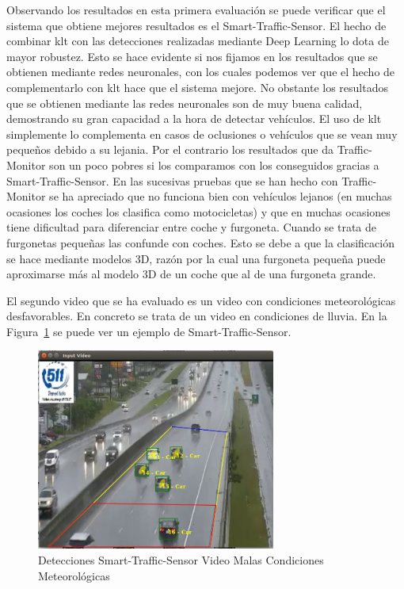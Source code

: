 Observando los resultados en esta primera evaluación se puede verificar que el sistema que obtiene mejores resultados es el Smart-Traffic-Sensor. El hecho de combinar \acrshort{klt} con las detecciones realizadas mediante Deep Learning lo dota de mayor robustez. Esto se hace evidente si nos fijamos en los resultados que se obtienen mediante redes neuronales, con los cuales podemos ver que el hecho de complementarlo con \acrshort{klt} hace que el sistema mejore. No obstante los resultados que se obtienen mediante las redes neuronales son de muy buena calidad, demostrando su gran capacidad a la hora de detectar vehículos. El uso de \acrshort{klt} simplemente lo complementa en casos de oclusiones o vehículos que se vean muy pequeños debido a su lejania. Por el contrario los resultados que da Traffic-Monitor son un poco pobres si los comparamos con los conseguidos gracias a Smart-Traffic-Sensor. En las sucesivas pruebas que se han hecho con Traffic-Monitor se ha apreciado que no funciona bien con vehículos lejanos (en muchas ocasiones los coches los clasifica como motocicletas) y que en muchas ocasiones tiene dificultad para diferenciar entre coche y furgoneta. Cuando se trata de furgonetas pequeñas las confunde con coches. Esto se debe a que la clasificación se hace mediante modelos 3D, razón por la cual una furgoneta pequeña puede aproximarse más al modelo 3D de un coche que al de una furgoneta grande.


El segundo video que se ha evaluado es un video con condiciones meteorológicas desfavorables. En concreto se trata de un video en condiciones de lluvia. En la Figura~\ref{fig.video_malas_condiciones} se puede ver un ejemplo de Smart-Traffic-Sensor.

\begin{figure}
\begin{center}
	\includegraphics[width=0.7\textwidth]{figures/Experimentos/sts_malas_condiciones.png}
   \caption{Detecciones Smart-Traffic-Sensor Video Malas Condiciones Meteorológicas}
	\label{fig.video_malas_condiciones}
\end{center}
\end{figure}

